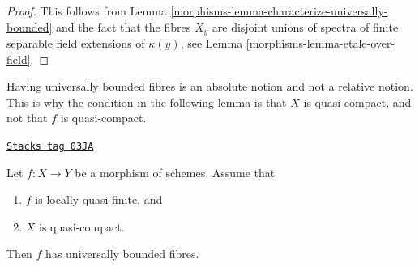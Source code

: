 \begin{proof}

This follows from
Lemma \ref{morphisms-lemma-characterize-universally-bounded}
and the fact that the fibres $X_y$ are disjoint unions of spectra of finite
separable field extensions of $\kappa(y)$, see
Lemma \ref{morphisms-lemma-etale-over-field}.
\end{proof}

Having universally bounded fibres is an absolute notion and not a relative
notion. This is why the condition in the following lemma is that $X$ is
quasi-compact, and not that $f$ is quasi-compact.

\begin{lemma}
\label{morphisms-lemma-locally-quasi-finite-qc-source-universally-bounded}
\href{https://stacks.math.columbia.edu/tag/03JA}{\texttt{Stacks tag 03JA}}

Let $f : X \to Y$ be a morphism of schemes.
Assume that
\begin{enumerate}
\item $f$ is locally quasi-finite, and
\item $X$ is quasi-compact.
\end{enumerate}
Then $f$ has universally bounded fibres.
\end{lemma}

